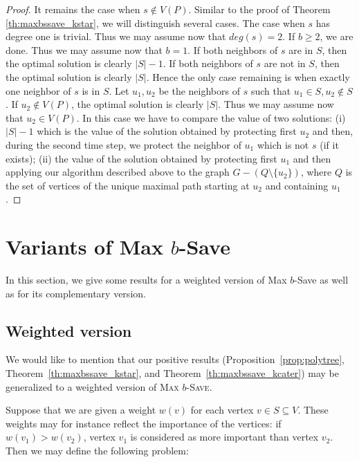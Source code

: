 \documentclass[10pt]{article}
\newcommand{\probtitle}[1]{\textsc{#1}}
\newcommand{\qedfill}[0]{ }
\begin{document}
\begin{proof}
It remains the case when $s\not\in V(P)$. Similar to the proof of Theorem \ref{th:maxbssave_kstar}, we will distinguish several cases. The case when $s$ has degree one is trivial. Thus we may assume now that $deg(s)=2$. If $b\geq 2$, we are done. Thus we may assume now that $b=1$. If both neighbors of $s$ are in $S$, then the optimal solution is clearly $|S|-1$. If both neighbors of $s$ are not in $S$, then the optimal solution is clearly $|S|$. Hence the only case remaining is when exactly one neighbor of $s$ is in $S$. Let $u_1,u_2$ be the neighbors of $s$ such that $u_1\in S,u_2\not\in S$. If $u_2\not\in V(P)$, the optimal solution is clearly $|S|$. Thus we may assume now that $u_2\in V(P)$. In this case we have to compare the value of two solutions: (i) $|S|-1$ which is the value of the solution obtained by protecting first $u_2$ and then, during the second time step, we protect the neighbor of $u_1$ which is not $s$ (if it exists); (ii) the value of the solution obtained by protecting first $u_1$ and then applying our algorithm described above to the graph $G-(Q\setminus \{u_2\})$, where $Q$ is the set of vertices of the unique maximal path starting at $u_2$ and containing $u_1$.
\qedfill
\end{proof}


\section{Variants of {\sc Max $b$-Save}} \label{s:variants}

In this section, we give some results for a weighted version of {\sc Max $b$-Save} as well as for its complementary version. 

\subsection{Weighted version}

We would like to mention that our positive results (Proposition~\ref{prop:polytree}, Theorem~\ref{th:maxbssave_kstar}, and Theorem~\ref{th:maxbssave_kcater}) may be generalized to a weighted version of \probtitle{Max $b$-Save}.

Suppose that we are given a weight $w(v)$ for each vertex $v \in S \subseteq V$. These weights may for instance reflect the importance of the vertices: if $w(v_1) > w(v_2)$, vertex $v_1$ is considered as more important than vertex $v_2$.
Then we may define the following problem:

\medskip
\end{document}
